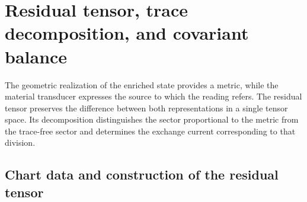 %

\section{Residual tensor, trace decomposition, and covariant balance}
\label{vii:sec:tensor-residual-balance}

The geometric realization of the enriched state provides a metric,
while the material transducer expresses the source to which the
reading refers. The residual tensor preserves the difference between
both representations in a single tensor space. Its decomposition distinguishes
the sector proportional to the metric from the trace-free sector and
determines the exchange current corresponding to that division.

\subsection{Chart data and construction of the residual tensor}
\label{vii:subsec:datos-tensor-residual}

